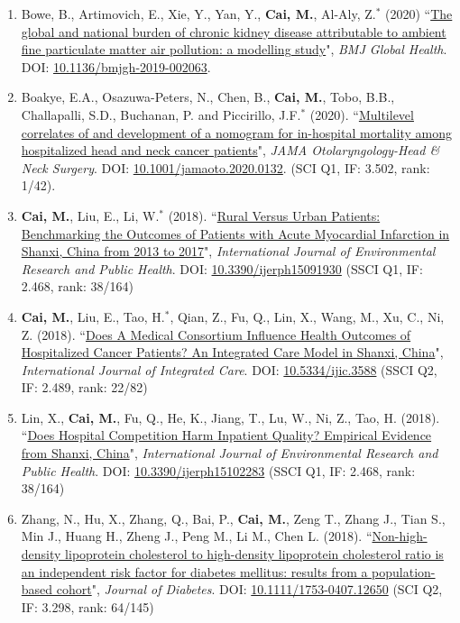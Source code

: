\documentclass[11pt, a4paper]{article}
\newcommand{\years}[1]{\marginnote{\scriptsize #1}}
\begin{document}
\begin{enumerate}[leftmargin=0ex,itemsep=1ex]
		\item Bowe, B., Artimovich, E., Xie, Y., Yan, Y., \textbf{Cai, M.}, Al-Aly, Z.$^\ast$ (2020) ``\ul{The global and national burden of chronic kidney disease attributable to ambient fine particulate matter air pollution: a modelling study}", \emph{BMJ Global Health}. DOI: \href{https://doi.org/10.1136/bmjgh-2019-002063}{10.1136/bmjgh-2019-002063}. 
		
		\item Boakye, E.A., Osazuwa-Peters, N., Chen, B., \textbf{Cai, M.}, Tobo, B.B., Challapalli, S.D., Buchanan, P. and Piccirillo, J.F.$^\ast$ (2020). ``\ul{Multilevel correlates of and development of a nomogram for in-hospital mortality among hospitalized head and neck cancer patients}", \emph{JAMA Otolaryngology-Head \& Neck Surgery}. DOI: \href{https://doi.org/10.1001/jamaoto.2020.0132}{10.1001/jamaoto.2020.0132}. (SCI Q1, IF: 3.502, rank: 1/42).
		
		
		
		\item \textcolor{RubineRed}{\textbf{Cai, M.}}, Liu, E., Li, W.$^\ast$ (2018). ``\ul{Rural Versus Urban Patients: Benchmarking the Outcomes of Patients with Acute Myocardial Infarction in Shanxi, China from 2013 to 2017}", \emph{International Journal of Environmental Research and Public Health}. DOI: \href{https://doi.org/10.3390/ijerph15091930}{10.3390/ijerph15091930} (SSCI Q1, IF: 2.468, rank: 38/164)
		
		\item \textcolor{RubineRed}{\textbf{Cai, M.}}, Liu, E., Tao, H.$^\ast$, Qian, Z., Fu, Q., Lin, X., Wang, M., Xu, C., Ni, Z. (2018). ``\ul{Does A Medical Consortium Influence Health Outcomes of Hospitalized Cancer Patients? An Integrated Care Model in Shanxi, China}", \emph{International Journal of Integrated Care}. DOI: \href{https://doi.org/10.5334/ijic.3588}{10.5334/ijic.3588} (SSCI Q2, IF: 2.489, rank: 22/82)
		
		\item \years{2018}Lin, X., \textbf{Cai, M.}, Fu, Q., He, K., Jiang, T., Lu, W., Ni, Z., Tao, H. (2018). ``\ul{Does Hospital Competition Harm Inpatient Quality? Empirical Evidence from Shanxi, China}", \emph{International Journal of Environmental Research and Public Health}. DOI: \href{https://doi.org/10.3390/ijerph15102283}{10.3390/ijerph15102283} (SSCI Q1, IF: 2.468, rank: 38/164)
		
		\item Zhang, N., Hu, X., Zhang, Q., Bai, P., \textbf{Cai, M.}, Zeng T., Zhang J., Tian S., Min J., Huang H., Zheng J., Peng M., Li M., Chen L. (2018). ``\ul{Non-high-density lipoprotein cholesterol to high-density lipoprotein cholesterol ratio is an independent risk factor for diabetes mellitus: results from a population-based cohort}", \emph{Journal of Diabetes}. DOI: \href{https://doi.org/10.1111/1753-0407.12650}{10.1111/1753-0407.12650} (SCI Q2, IF: 3.298, rank: 64/145)
		

\end{enumerate}
\end{document}
